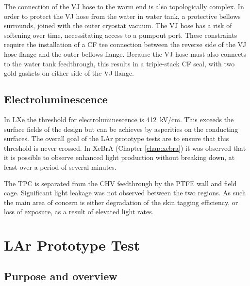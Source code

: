 The connection of the VJ hose to the warm end is also topologically complex.
In order to protect the VJ hose from the water in water tank, a protective bellows surrounds, joined with the outer cryostat vacuum.
The VJ hose has a risk of softening over time, necessitating access to a pumpout port.
These constraints require the installation of a CF tee connection between the reverse side of the VJ hose flange and the outer bellows flange.
Because the VJ hose must also connects to the water tank feedthrough, this results in a triple-stack CF seal, with two gold gaskets on either side of the VJ flange.


\subsection{Electroluminescence}
In LXe the threshold for electroluminescence is 412~kV/cm\cite{aprile_measurements_2014}.
This exceeds the surface fields of the design but can be achieves by asperities on the conducting surfaces.
The overall goal of the LAr prototype tests are to ensure that this threshold is never crossed.
In XeBrA (Chapter \ref{chap:xebra}) it was observed that it is possible to observe enhanced light production without breaking down, at least over a period of several minutes.

The TPC is separated from the CHV feedthrough by the PTFE wall and field cage.
Significant light leakage was not observed between the two regions.
As such the main area of concern is either degradation of the skin tagging efficiency, or loss of exposure, as a result of elevated  light rates.


\section{LAr Prototype Test}
\subsection{Purpose and overview}

